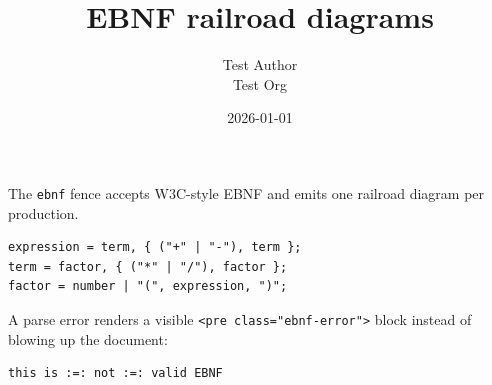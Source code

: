 \documentclass[11pt,a4paper]{article}
\title{EBNF railroad diagrams}
\author{Test Author \\ Test Org}
\date{2026-01-01}
\theoremstyle{definition}
\begin{document}
\maketitle

The \texttt{ebnf} fence accepts W3C-style EBNF and emits one railroad
diagram per production.


\begin{lstlisting}
expression = term, { ("+" | "-"), term };
term = factor, { ("*" | "/"), factor };
factor = number | "(", expression, ")";
\end{lstlisting}


A parse error renders a visible \texttt{<pre class="ebnf-error">} block
instead of blowing up the document:


\begin{lstlisting}
this is :=: not :=: valid EBNF
\end{lstlisting}
\end{document}
